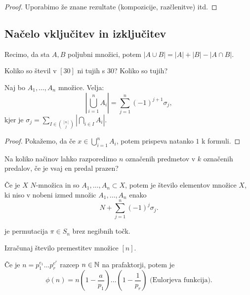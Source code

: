 \begin{proof}
    Uporabimo že znane rezultate (kompozicije, razčlenitve) itd.
\end{proof}

\subsection{Načelo vključitev in izključitev}
Recimo, da sta $A, B$ poljubni množici, potem $|A \cup B| = |A| + |B| - |A \cap B|$.
\begin{primer}
    Koliko so števil v $[30]$ ni tujih s $30$? Koliko so tujih?
\end{primer}

\begin{izrek}
    Naj bo $A_1, \ldots, A_n$ množice. Velja: 
    $$\left| \bigcup_{i=1}^n A_i \right| = \sum_{j=1}^{n}(-1)^{j+1}\sigma_j,$$
    kjer je $\displaystyle \sigma_j = \sum_{I \in \binom{[n]}{j}} \left|\bigcap_{i \in I} A_i\right|$.
\end{izrek}

\begin{proof}
    Pokažemo, da če $x \in \bigcup_{i=1}^n A_i$, potem prispeva natanko $1$ k formuli.
\end{proof}

\begin{primer}
    Na koliko načinov lahko razporedimo $n$ označenih predmetov v $k$ označenih predalov, če je vsaj en predal prazen?
\end{primer}

\begin{posledica}
    Če je $X$ $N$-množica in so $A_1, \ldots, A_n \subset X$, potem je število elementov množice $X$, ki niso v nobeni izmed množic $A_1, \ldots, A_n$ enako 
    $$N + \sum_{j=1}^{n}(-1)^j \sigma_j.$$
\end{posledica}

\begin{definicija}
     je permutacija $\pi \in S_n$ brez negibnih točk.
\end{definicija}

\begin{primer}
    Izračunaj število premestitev množice $[n]$.
\end{primer}

\begin{izrek}
    Če je $n = p_1^{e_1} \ldots p_r^{e^r}$ razcep $n \in \mathbb{N}$ na prafaktorji, potem je 
    $$\phi(n) = n(1 - \frac{a}{p_1}) \ldots (1 - \frac{1}{p_r}) \text{ (Eulorjeva funkcija)}.$$
\end{izrek}

